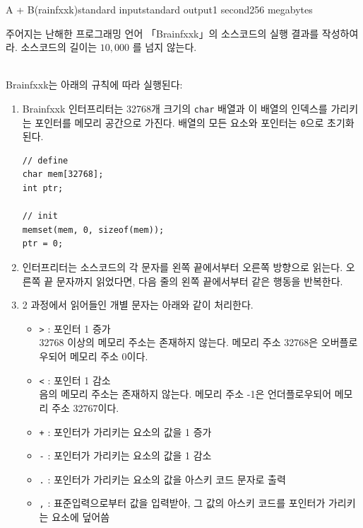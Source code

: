 \begin{problem}{A + B(rainfxxk)}{standard input}{standard output}{1 second}{256 megabytes}

주어지는 난해한 프로그래밍 언어 「Brainfxxk」의 소스코드의 실행 결과를 작성하여라. 소스코드의 길이는 $10,000$ 를 넘지 않는다.  

\\

Brainfxxk는 아래의 규칙에 따라 실행된다:

\begin{enumerate}
\item 
Brainfxxk 인터프리터는 32768개 크기의 \texttt{char} 배열과 이 배열의 인덱스를 가리키는 포인터를 메모리 공간으로 가진다. 배열의 모든 요소와 포인터는 \texttt{0}으로 초기화된다.

\begin{lstlisting}
// define
char mem[32768];
int ptr;

// init
memset(mem, 0, sizeof(mem));
ptr = 0;
\end{lstlisting}

\item 
인터프리터는 소스코드의 각 문자를 왼쪽 끝에서부터 오른쪽 방향으로 읽는다. 오른쪽 끝 문자까지 읽었다면, 다음 줄의 왼쪽 끝에서부터 같은 행동을 반복한다.


\item 
2 과정에서 읽어들인 개별 문자는 아래와 같이 처리한다.

\begin{itemize}
\item 
\texttt{>} : 포인터 1 증가\\
32768 이상의 메모리 주소는 존재하지 않는다. 메모리 주소 32768은 오버플로우되어 메모리 주소 0이다.


\item 
\texttt{<} : 포인터 1 감소\\
음의 메모리 주소는 존재하지 않는다. 메모리 주소 -1은 언더플로우되어 메모리 주소 32767이다.


\item 
\texttt{+} : 포인터가 가리키는 요소의 값을 1 증가


\item 
\texttt{-} : 포인터가 가리키는 요소의 값을 1 감소


\item 
\texttt{.} : 포인터가 가리키는 요소의 값을 아스키 코드 문자로 출력


\item 
\texttt{,} : 표준입력으로부터 값을 입력받아, 그 값의 아스키 코드를 포인터가 가리키는 요소에 덮어씀



\end{itemize}
\end{enumerate}
\end{problem}
